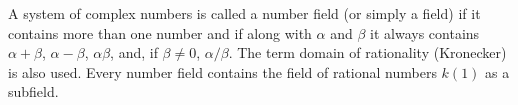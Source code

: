 A system of complex numbers is called a number field (or simply a field) if it contains more than one number and if along with $\alpha$ and $\beta$ it always contains $\alpha + \beta$, $\alpha - \beta$, $\alpha\beta$, and, if $\beta \neq 0$, $\alpha/\beta$. The term domain of rationality (Kronecker) is also used. Every number field contains the field of rational numbers $k(1)$ as a subfield.
